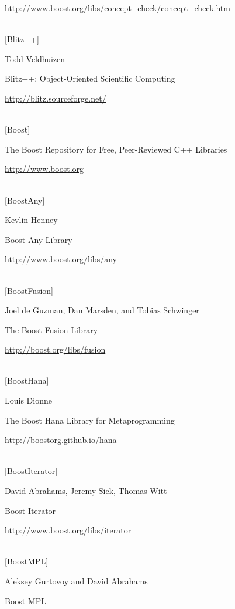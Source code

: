 \url{http://www.boost.org/libs/concept_check/concept_check.htm}

\hspace*{\fill} \\ %
{[Blitz++]}

Todd Veldhuizen

Blitz++: Object-Oriented Scientific Computing

\url{http://blitz.sourceforge.net/}

\hspace*{\fill} \\ %
{[Boost]}

The Boost Repository for Free, Peer-Reviewed C++ Libraries

\url{http://www.boost.org}

\hspace*{\fill} \\ %
{[BoostAny]}

Kevlin Henney

Boost Any Library

\url{http://www.boost.org/libs/any}

\hspace*{\fill} \\ %
{[BoostFusion]}

Joel de Guzman, Dan Marsden, and Tobias Schwinger

The Boost Fusion Library

\url{http://boost.org/libs/fusion}

\hspace*{\fill} \\ %
{[BoostHana]}

Louis Dionne

The Boost Hana Library for Metaprogramming

\url{http://boostorg.github.io/hana}

\hspace*{\fill} \\ %
{[BoostIterator]}

David Abrahams, Jeremy Siek, Thomas Witt

Boost Iterator

\url{http://www.boost.org/libs/iterator}

\hspace*{\fill} \\ %
{[BoostMPL]}

Aleksey Gurtovoy and David Abrahams

Boost MPL

